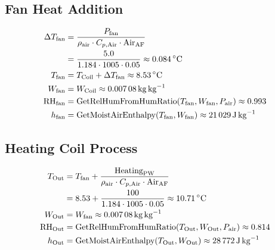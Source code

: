 \documentclass[12pt]{article}
\begin{document}
\subsection{Fan Heat Addition}
\begin{align}
    \Delta T_{\text{fan}} &= \frac{P_{\text{fan}}}{\rho_{\text{air}} \cdot C_{p,\text{Air}} \cdot \text{Air}_{\text{AF}}} \notag \\
    &= \frac{5.0}{1.184 \cdot 1005 \cdot 0.05} \approx \SI{0.084}{\celsius} \\
    T_{\text{fan}} &= T_{\text{Coil}} + \Delta T_{\text{fan}} \approx \SI{8.53}{\celsius} \\
    W_{\text{fan}} &= W_{\text{Coil}} \approx \SI{0.00708}{\kilo\gram\per\kilo\gram} \\
    \text{RH}_{\text{fan}} &= \text{GetRelHumFromHumRatio}(T_{\text{fan}}, W_{\text{fan}}, P_{\text{air}}) \approx 0.993 \\
    h_{\text{fan}} &= \text{GetMoistAirEnthalpy}(T_{\text{fan}}, W_{\text{fan}}) \approx \SI{21029}{\joule\per\kilo\gram}
\end{align}

\subsection{Heating Coil Process}
\begin{align}
    T_{\text{Out}} &= T_{\text{fan}} + \frac{\text{Heating}_{\text{PW}}}{\rho_{\text{air}} \cdot C_{p,\text{Air}} \cdot \text{Air}_{\text{AF}}} \notag \\
    &= 8.53 + \frac{100}{1.184 \cdot 1005 \cdot 0.05} \approx \SI{10.71}{\celsius} \\
    W_{\text{Out}} &= W_{\text{fan}} \approx \SI{0.00708}{\kilo\gram\per\kilo\gram} \\
    \text{RH}_{\text{Out}} &= \text{GetRelHumFromHumRatio}(T_{\text{Out}}, W_{\text{Out}}, P_{\text{air}}) \approx 0.814 \\
    h_{\text{Out}} &= \text{GetMoistAirEnthalpy}(T_{\text{Out}}, W_{\text{Out}}) \approx \SI{28772}{\joule\per\kilo\gram}
\end{align}
\end{document}

